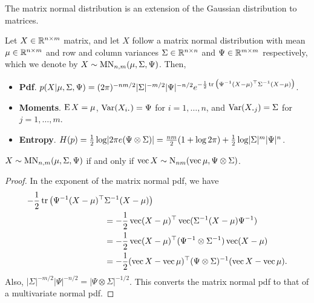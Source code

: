 The matrix normal distribution is an extension of the Gaussian distribution to matrices.

\begin{definition}
  Let $X\in\bbR^{n \times m}$ matrix, and let $X$ follow a matrix normal distribution with mean $\mu\in\bbR^{n \times m}$ and row and column variances $\Sigma \in \bbR^{n \times n}$ and $\Psi \in \bbR^{m \times m}$ respectively, which we denote by $X\sim\MN_{n,m}(\mu,\Sigma,\Psi)$.
  Then,
  \begin{itemize}
    \item \textbf{Pdf}. $p(X|\mu,\Sigma,\Psi) = (2\pi)^{-nm/2}|\Sigma|^{-m/2}|\Psi|^{-n/2} e^{-\half \tr \big(\Psi^{-1}(X-\mu)^\top\Sigma^{-1}(X-\mu)\big)}$.
    \item \textbf{Moments}. $\E X=\mu$, $\Var(X_{i \bigcdot }) = \Psi$ for $i=1,\dots,n$, and $\Var(X_{\bigcdot j}) = \Sigma$ for $j=1,\dots,m$. 
    \item \textbf{Entropy}. $H(p) = \half \log \abs{2\pi e (\Psi \otimes \Sigma)} = \half[nm](1 + \log 2\pi) + \half\log\abs{\Sigma}^m\abs{\Psi}^n$.
  \end{itemize}
\end{definition}

\begin{lemma}
  $X\sim\MN_{n,m}(\mu,\Sigma,\Psi)$ if and only if $\vecc X\sim \N_{nm}(\vecc\mu,\Psi \otimes \Sigma)$.
\end{lemma}

\begin{proof}
  In the exponent of the matrix normal pdf, we have
  \begin{align*}
    -\half \tr \big(\Psi^{-1}(X-\mu)^\top &\Sigma^{-1}(X-\mu)\big) \\
    &= -\half \vecc(X-\mu)^\top \vecc(\Sigma^{-1}(X-\mu)\Psi^{-1}) \\
    &= -\half \vecc(X-\mu)^\top (\Psi^{-1} \otimes \Sigma^{-1}) \vecc(X-\mu) \\
    &= -\half (\vecc X- \vecc \mu)^\top (\Psi \otimes \Sigma)^{-1} (\vecc X- \vecc \mu).     
  \end{align*} 
  Also, $|\Sigma|^{-m/2}|\Psi|^{-n/2} = |\Psi \otimes \Sigma|^{-1/2}$.
  This converts the matrix normal pdf to that of a multivariate normal pdf.
\end{proof}

